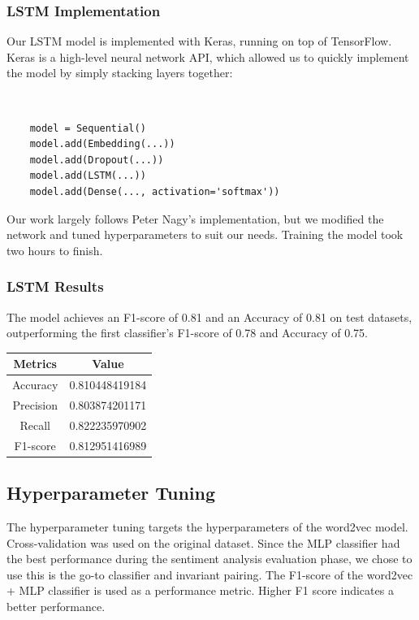 \documentclass[11pt,a4paper]{article}
\begin{document}
\subsubsection{LSTM Implementation}
Our LSTM model is implemented with Keras, running on top of TensorFlow. Keras is a high-level neural network API, which allowed us to quickly implement the model by simply stacking layers together:
{\tt \small
	\begin{verbatim}
	model = Sequential()
	model.add(Embedding(...))
	model.add(Dropout(...))
	model.add(LSTM(...))
	model.add(Dense(..., activation='softmax'))
	\end{verbatim}
}

Our work largely follows Peter Nagy's implementation\cite{peter}, but we modified the network and tuned hyperparameters to suit our needs. Training the model took two hours to finish.

\subsubsection{LSTM Results}
The model achieves an F1-score of 0.81 and an Accuracy of 0.81 on test datasets, outperforming the first classifier's F1-score of 0.78 and Accuracy of 0.75.  \\

\begin{center}
	\begin{tabular}{|c|c|}
		
		\hline
		Metrics & Value \\
		\hline
		Accuracy & 0.810448419184 \\
		Precision & 0.803874201171 \\
		Recall & 0.822235970902 \\
		F1-score & 0.812951416989 \\
		\hline
	\end{tabular}
\end{center}

\subsection{Hyperparameter Tuning}
The hyperparameter tuning targets the hyperparameters of the word2vec model. Cross-validation was used on the original dataset. Since the MLP classifier had the best performance during the sentiment analysis evaluation phase, we chose to use this is the go-to classifier and invariant pairing. The F1-score of the word2vec + MLP classifier is used as a performance metric. Higher F1 score indicates a better performance. 
\end{document}

